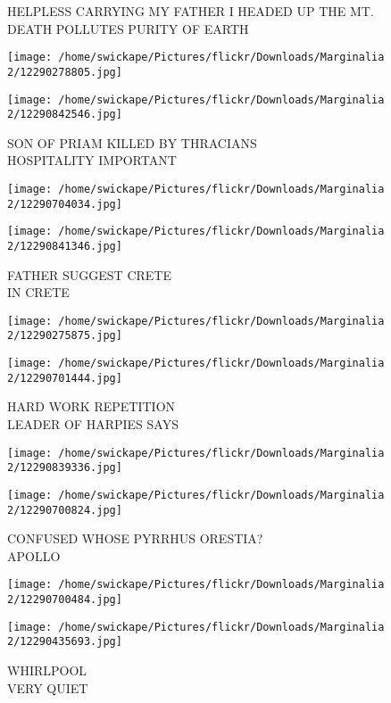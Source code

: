 \documentclass[10pt,letterpaper]{article}
\begin{document}
HELPLESS CARRYING MY FATHER I HEADED UP THE MT.\\
DEATH POLLUTES PURITY OF EARTH
\pagebreak

\texttt{[image: /home/swickape/Pictures/flickr/Downloads/Marginalia 2/12290278805.jpg]}

\vspace{0.25in}
\texttt{[image: /home/swickape/Pictures/flickr/Downloads/Marginalia 2/12290842546.jpg]}

SON OF PRIAM KILLED BY THRACIANS\\
HOSPITALITY IMPORTANT
\pagebreak

\texttt{[image: /home/swickape/Pictures/flickr/Downloads/Marginalia 2/12290704034.jpg]}

\vspace{0.25in}
\texttt{[image: /home/swickape/Pictures/flickr/Downloads/Marginalia 2/12290841346.jpg]}

FATHER SUGGEST CRETE\\
IN CRETE
\pagebreak

\texttt{[image: /home/swickape/Pictures/flickr/Downloads/Marginalia 2/12290275875.jpg]}

\vspace{0.25in}
\texttt{[image: /home/swickape/Pictures/flickr/Downloads/Marginalia 2/12290701444.jpg]}

HARD WORK REPETITION\\
LEADER OF HARPIES SAYS
\pagebreak

\texttt{[image: /home/swickape/Pictures/flickr/Downloads/Marginalia 2/12290839336.jpg]}

\vspace{0.25in}
\texttt{[image: /home/swickape/Pictures/flickr/Downloads/Marginalia 2/12290700824.jpg]}

CONFUSED WHOSE PYRRHUS ORESTIA?\\
APOLLO
\pagebreak

\texttt{[image: /home/swickape/Pictures/flickr/Downloads/Marginalia 2/12290700484.jpg]}

\vspace{0.25in}
\texttt{[image: /home/swickape/Pictures/flickr/Downloads/Marginalia 2/12290435693.jpg]}

WHIRLPOOL\\
VERY QUIET
\pagebreak
\end{document}
